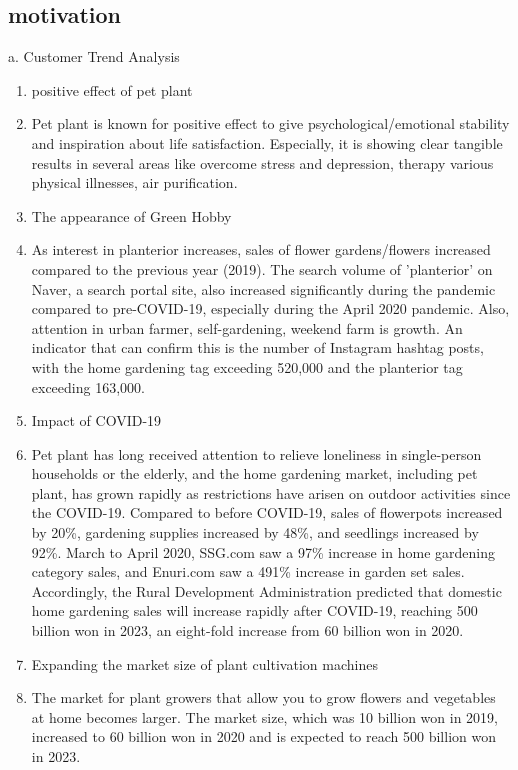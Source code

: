 \documentclass[conference, a4paper]{IEEEtran}
\begin{document}
\subsection{motivation}
a. Customer Trend Analysis
\begin{enumerate}
    \item positive effect of pet plant
    \item[] Pet plant is known for positive effect to give psychological/emotional stability and inspiration about life satisfaction. Especially, it is showing clear tangible results in several areas like overcome stress and depression, therapy various physical illnesses, air purification.\cite{ju2020}\\
    
    \item The appearance of Green Hobby
    \item[] As interest in planterior increases, sales of flower gardens/flowers increased compared to the previous year (2019). The search volume of 'planterior' on Naver, a search portal site, also increased significantly during the pandemic compared to pre-COVID-19, especially during the April 2020 pandemic. Also, attention in urban farmer, self-gardening, weekend farm is growth. An indicator that can confirm this is the number of Instagram hashtag posts, with the home gardening tag exceeding 520,000 and the planterior tag exceeding 163,000. \cite{hanaif_report} \\
    
    \item Impact of COVID-19
    \item[] Pet plant has long received attention to relieve loneliness in single-person households or the elderly, and the home gardening market, including pet plant, has grown rapidly as restrictions have arisen on outdoor activities since the COVID-19.
Compared to before COVID-19, sales of flowerpots increased by 20\%, gardening supplies increased by 48\%, and seedlings increased by 92\%. March to April 2020, SSG.com saw a 97\% increase in home gardening category sales, and Enuri.com saw a 491\% increase in garden set sales.
Accordingly, the Rural Development Administration predicted that domestic home gardening sales will increase rapidly after COVID-19, reaching 500 billion won in 2023, an eight-fold increase from 60 billion won in 2020. \cite{ajunews_article} \\

\item Expanding the market size of plant cultivation machines
\item[] The market for plant growers that allow you to grow flowers and vegetables at home becomes larger. The market size, which was 10 billion won in 2019, increased to 60 billion won in 2020 and is expected to reach 500 billion won in 2023. \cite{spcmagazine_article}
\\


\end{enumerate}
\end{document}
